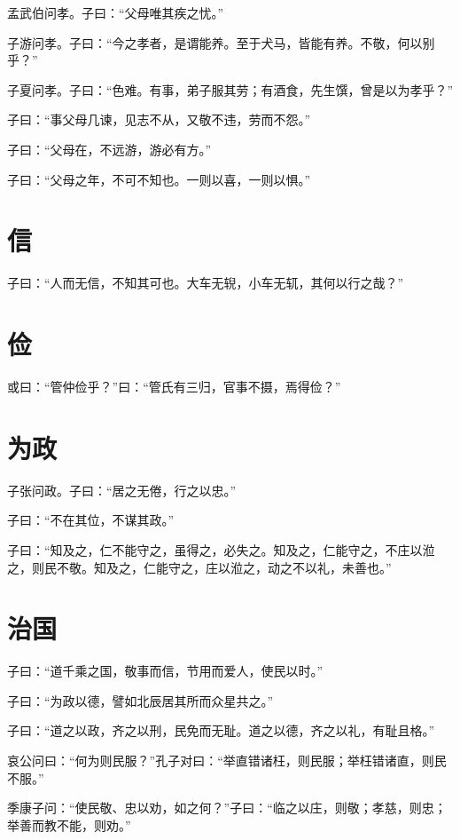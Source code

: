 \documentclass[a5paper]{ctexbook}
\begin{document}
    孟武伯问孝。子曰：“父母唯其疾之忧。”

    子游问孝。子曰：“今之孝者，是谓能养。至于犬马，皆能有养。不敬，何以别乎？”

    子夏问孝。子曰：“色难。有事，弟子服其劳；有酒食，先生馔，曾是以为孝乎？”

    子曰：“事父母几谏，见志不从，又敬不违，劳而不怨。”

    子曰：“父母在，不远游，游必有方。”

    子曰：“父母之年，不可不知也。一则以喜，一则以惧。”

    

    \chapter{信}

    子曰：“人而无信，不知其可也。大车无𫐐，小车无𫐄，其何以行之哉？”

    \chapter{俭}

    或曰：“管仲俭乎？”曰：“管氏有三归，官事不摄，焉得俭？”

    \chapter{为政}

    子张问政。子曰：“居之无倦，行之以忠。”

    子曰：“不在其位，不谋其政。”

    子曰：“知及之，仁不能守之，虽得之，必失之。知及之，仁能守之，不庄以涖之，则民不敬。知及之，仁能守之，庄以涖之，动之不以礼，未善也。”

    \chapter{治国}

    子曰：“道千乘之国，敬事而信，节用而爱人，使民以时。”

    子曰：“为政以德，譬如北辰居其所而众星共之。”

    子曰：“道之以政，齐之以刑，民免而无耻。道之以德，齐之以礼，有耻且格。”

    哀公问曰：“何为则民服？”孔子对曰：“举直错诸枉，则民服；举枉错诸直，则民不服。”

    季康子问：“使民敬、忠以劝，如之何？”子曰：“临之以庄，则敬；孝慈，则忠；举善而教不能，则劝。”
\end{document}
